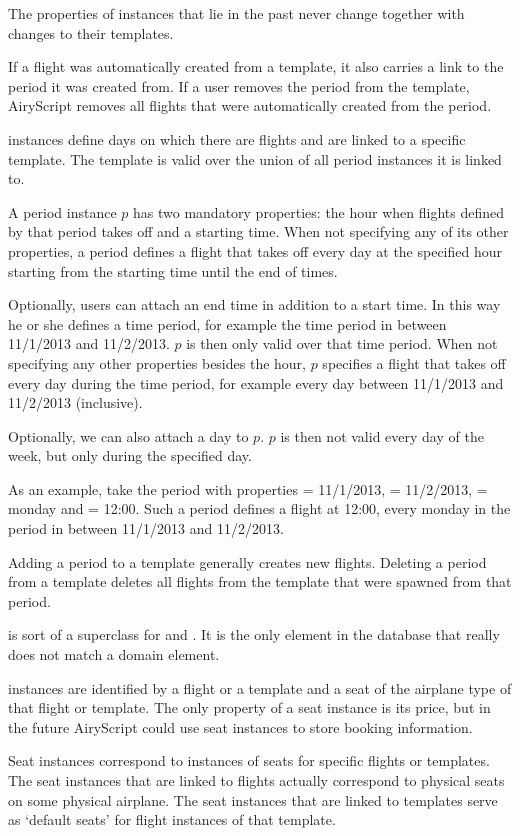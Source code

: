 \begin{description}
    The properties of  instances that lie in the past never change
    together with changes to their templates.

    If a flight was automatically created from a template, it also carries a
    link to the period it was created from. If a user removes the period from
    the template, AiryScript removes all flights that were automatically created
    from the period.

  \item[\dbf{Period}] instances define days on which there are flights and are
    linked to a specific template. The template is valid over the union of all
    period instances it is linked to.

    A period instance $p$ has two mandatory properties: the hour when flights
    defined by that period takes off and a starting time. When not specifying
    any of its other properties, a period defines a flight that takes off every
    day at the specified hour starting from the starting time until the end of
    times.

    Optionally, users can attach an end time in addition to a start time. In
    this way he or she defines a time period, for example the time period in
    between 11/1/2013 and 11/2/2013. $p$ is then only valid over that time
    period. When not specifying any other properties besides the hour, $p$
    specifies a flight that takes off every day during the time period, for
    example every day between 11/1/2013 and 11/2/2013 (inclusive).

    Optionally, we can also attach a day to $p$. $p$ is then not valid every
    day of the week, but only during the specified day.

    As an example, take the period with properties  = 11/1/2013,
     = 11/2/2013,  = monday and  =
    12:00. Such a period defines a flight at 12:00, every monday in the period
    in between 11/1/2013 and 11/2/2013.

    Adding a period to a template generally creates new flights. Deleting a
    period from a template deletes all flights from the template that were
    spawned from that period.
    
  \item[\dbf{Bookable}] is sort of a superclass for  and
    . It is the only element in the database that really does not
    match a domain element.

  \item[\dbf{SeatInstance}] instances are identified by a flight or a template
    and a seat of the airplane type of that flight or template. The only
    property of a seat instance is its price, but in the future AiryScript could
    use seat instances to store booking information.
    
    Seat instances correspond to instances of seats for specific flights or
    templates. The seat instances that are linked to flights actually correspond
    to physical seats on some physical airplane. The seat instances that are
    linked to templates serve as ‘default seats’ for flight instances of that
    template.
\end{description}
